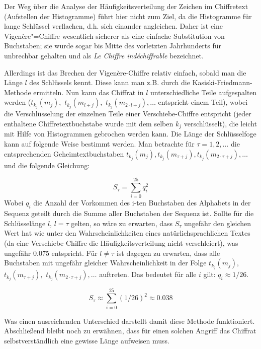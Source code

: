 Der Weg über die Analyse der Häufigkeitsverteilung der Zeichen im Chiffretext (Aufstellen der Histogramme) führt hier nicht zum Ziel, da die Histogramme für
lange Schlüssel verflachen, d.h. sich einander angleichen. Daher ist eine Vigen\`ere"=Chiffre wesentlich sicherer als eine einfache Substitution von
Buchstaben; sie wurde sogar bis Mitte des vorletzten Jahrhunderts für unbrechbar gehalten und als \emph{Le Chiffre ind\'{e}chiffrable} bezeichnet.

Allerdings ist das Brechen der Vigen\`ere-Chiffre relativ einfach, sobald man die Länge $l$ des Schlüssels kennt. Diese kann man z.B. durch die
Kasiski-Friedmann-Methode ermitteln. %
Nun kann das Chiffrat in $l$ unterschiedliche Teile aufgespalten werden ($t_{k_j}(m_j),$ $t_{k_j}(m_{l+j}),$ $t_{k_j}(m_{2 \cdot
l+j}),\ldots$ entspricht einem Teil), wobei die Verschlüsselung der einzelnen Teile einer Verschiebe-Chiffre entspricht (jeder enthaltene Chiffretextbuchstabe
wurde mit dem selben $k_j$ verschlüsselt), die leicht mit Hilfe von Histogrammen gebrochen werden kann. Die Länge der Schlüsselfoge kann auf folgende Weise
bestimmt werden. Man betrachte für $\tau = 1,2,\ldots$ die entsprechenden Geheimtextbuchstaben $t_{k_j}(m_j),t_{k_j}(m_{\tau+j}),t_{k_j}(m_{2 \cdot
\tau+j}),\ldots$ und die folgende Gleichung:

\begin{equation}
 S_{\tau}=	\sum_{i=0}^{25} q^2_i
\end{equation}
Wobei $q_i$ die Anzahl der Vorkommen des i-ten Buchstaben des Alphabets in der Sequenz geteilt durch die Summe aller Buchstaben der Sequenz ist. Sollte für die
Schlüsselänge $l$, $l = \tau$ gelten, so wäre zu erwarten, dass $S_{\tau}$ ungefähr den gleichen Wert hat wie unter den Wahrscheinlichkeiten eines
natürlichsprachlichen Textes (da eine Verschiebe-Chiffre die Häufigkeitsverteilung nicht verschleiert), was ungefähr $0.075$ entspricht. Für $l \neq \tau$ ist
dagegen zu erwarten, dass alle Buchstaben mit ungefähr gleicher Wahrscheinlichkeit in der Folge $t_{k_j}(m_j),$ $t_{k_j}(m_{\tau+j}),$ $t_{k_j}(m_{2 \cdot
\tau+j}),\ldots$ auftreten. Das bedeutet für alle $i$ gilt: $q_i \approx 1/26$.

\begin{equation}
 S_{\tau} \approx \sum_{i=0}^{25} (1/26)^2 \approx 0.038
\end{equation}

Was einen ausreichenden Unterschied darstellt damit diese Methode funktioniert. Abschließend bleibt noch zu erwähnen, dass für einen solchen Angriff das
Chiffrat selbstverständlich eine gewisse Länge aufweisen muss.

